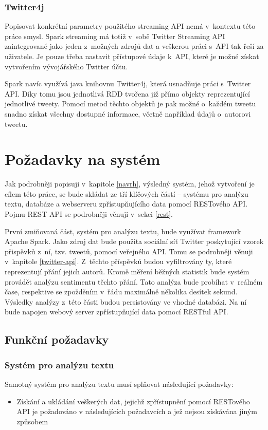 \documentclass[thesis=B,czech]{FITthesis}[2012/06/26]
\begin{document}
\subsubsection{Twitter4j}
	Popisovat konkrétní parametry použitého streaming API nemá v~kontextu této práce smysl. Spark streaming má totiž v~sobě Twitter Streaming API zaintegrované jako jeden z~možných zdrojů dat a veškerou práci s~API tak řeší za uživatele. Je pouze třeba nastavit přístupové údaje k~API, které je možné získat vytvořením vývojářského Twitter účtu. 
	
	Spark navíc využívá java knihovnu Twitter4j\cite{twitter4j}, která usnadňuje práci s~Twitter API. Díky tomu jsou jednotlivá RDD tvořena již přímo objekty reprezentující jednotlivé tweety. Pomocí metod těchto objektů je pak možné o~každém tweetu snadno získat všechny dostupné informace, včetně například údajů o~autorovi tweetu. 


\section{Požadavky na systém}
\label{pozadavky}
	Jak podrobněji popisuji v~kapitole \ref{navrh}, výsledný systém, jehož vytvoření je cílem této práce, se bude skládat ze tří klíčových částí -- systému pro analýzu textu, databáze a webserveru zpřístupňujícího data pomocí RESTového API. Pojmu REST API se podrobněji věnuji v~sekci \ref{rest}. 
	
	 První zmiňovaná část, systém pro analýzu textu, bude využívat framework Apache Spark. Jako zdroj dat bude použita sociální síť Twitter poskytující vzorek přispěvků z~ní, tzv. tweetů, pomocí veřejného API. Tomu se podrobněji věnuji v~kapitole \ref{twitter-api}. Z~těchto příspěvků budou vyfiltrovány ty, které reprezentují přání jejich autorů. Kromě měření běžných statistik bude systém provádět analýzu sentimentu těchto přání. Tato analýza bude probíhat v~reálném čase, respektive se zpožděním v~řádu maximálně několika desítek sekund.  Výsledky analýzy z~této části budou persistovány ve vhodné databázi. Na ní bude napojen webový server zpřístupňující data pomocí RESTful API. 

\subsection{Funkční požadavky}
\subsubsection{Systém pro analýzu textu}
Samotný systém pro analýzu textu musí splňovat následující požadavky:
\begin{itemize}
\item Získání a ukládání veškerých dat, jejichž zpřístupnění pomocí RESTového API je požadováno v následujících požadavcích a jež nejsou získávána jiným způsobem
\end{itemize}
\end{document}
